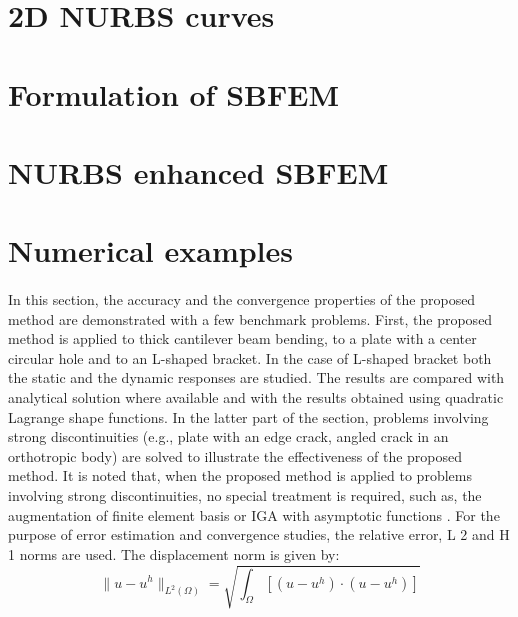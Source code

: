 \section{2D NURBS curves}


    
\section{Formulation of SBFEM}

\section{NURBS enhanced SBFEM}


\section{Numerical examples}
\paragraph{}
In this section, the accuracy and the convergence properties of the proposed method are demonstrated with a few
    benchmark problems.
First, the proposed method is applied to thick cantilever beam bending, to a plate with a center
    circular hole and to an L-shaped bracket.
In the case of L-shaped bracket both the static and the dynamic responses are studied.
The results are compared with analytical solution where available and with the results obtained using quadratic
    Lagrange shape functions.
In the latter part of the section, problems involving strong discontinuities (e.g., plate with an edge crack,
    angled crack in an orthotropic body) are solved to illustrate the effectiveness of the proposed method.
It is noted that, when the proposed method is applied to problems involving strong discontinuities, no special 
    treatment is required, such as, the augmentation of finite element basis or IGA with asymptotic functions
    \cite{Benson2010} \cite{De2011}.
For the purpose of error estimation and convergence studies, the relative error, L 2 and H 1 norms are used.
The displacement norm is given by:
    \begin{equation}
        \| u - u^h \|_{L^2(\Omega)}=
        \sqrt{
            \int_{\Omega}\left[
                \left(
                    u-u^h
                \right) \cdot
                \left(
                    u-u^h
                \right)
            \right]
        }
    \end{equation}

